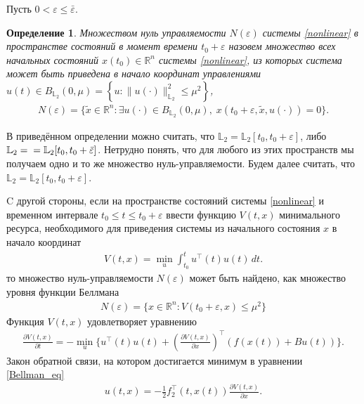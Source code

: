\documentclass[12pt,a4paper,twoside]{article}  %
\newtheorem{df}{Определение}
\begin{document}
Пусть $ 0 <  \varepsilon \leqslant \bar{\varepsilon} $.
\begin{df}
	{\it Множеством нуль управляемости} $ N(\varepsilon) $ системы \eqref{nonlinear} в пространстве состояний в момент времени $ t_0 + \varepsilon $ назовем
	множество всех начальных состояний $ x(t_0) \in \mathbb{R}^n $ системы \eqref{nonlinear},  из которых система может быть приведена в начало координат управлениями
	$ u(t) \in B_{\mathbb{L}_2}(0,\mu)  =\left\lbrace u:\lVert u(\cdot)\rVert^2_{\mathbb{L}_2} \leqslant \mu^2\right\rbrace  $,
	\begin{gather*}
		N(\varepsilon)=\{\widetilde{x}\in \mathbb{R}^n:\exists u(\cdot)\in B_{\mathbb{L}_2}(0,\mu),\; x(t_0 + \varepsilon,\widetilde{x},u(\cdot)) = 0\}.
	\end{gather*}
\end{df}

В приведённом определении можно считать, что $ \mathbb{L}_2 =\mathbb{L}_2[t_0,t_0+\varepsilon] $, либо  $ \mathbb{L}_2 =\\=\mathbb{L}_2[t_0,t_0+\bar{\varepsilon}] $. Нетрудно понять, что для любого из этих пространств мы получаем одно и то же множество нуль-управляемости. Будем далее считать, что $ \mathbb{L}_2 =\mathbb{L}_2[t_0,t_0+\varepsilon] $.

C другой стороны, если на пространстве состояний системы \eqref{nonlinear} и временном интервале $ t_0 \leqslant t \leqslant t_0 + \varepsilon $ ввести функцию $ V(t,x) $ минимального ресурса, необходимого для приведения системы из начального состояния $x$ в начало координат
\begin{gather}\label{Bellman_fun}
	V(t,x) = \min\limits_{u} \int_{t_0}^{t} u^{\top}(t) u(t) \, dt.
\end{gather}
то множество нуль-управляемости $ N(\varepsilon) $ может быть найдено, как множество уровня функции Беллмана
\begin{gather}\label{Null_set}
	N(\varepsilon)  = \{x \in \mathbb{R}^n: V(t_0 + \varepsilon,x) \leqslant \mu^2\}
\end{gather}
Функция $V(t,x)$  удовлетворяет уравнению
\begin{gather}\label{Bellman_eq}
	\frac{\partial V(t,x)}{\partial t} = -\min\limits_{u} \{u^{\top}(t) u(t) + \left(\frac{\partial V(t,x)}{\partial x}\right)^{\top} \left(f(x(t))+B u(t)\right) \}.
\end{gather}
Закон обратной связи, на котором достигается минимум в уравнении \eqref{Bellman_eq}
\begin{gather}\label{feedback}
	u(t,x) = -\frac{1}{2} f_2^{\top}(t,x(t))\frac{\partial V(t,x)}{\partial x}.
\end{gather}
\end{document}
